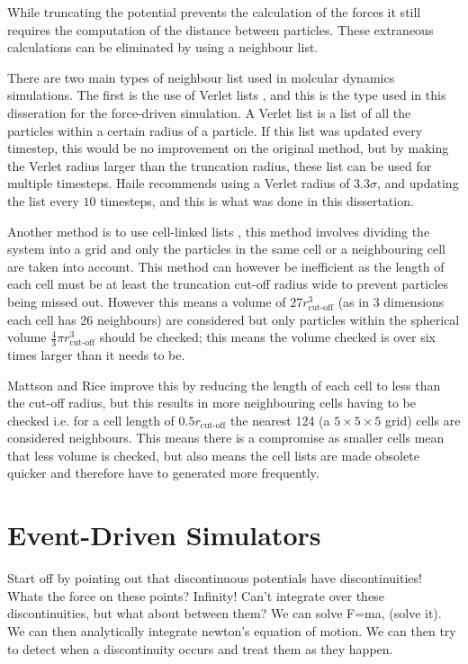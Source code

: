 \documentclass[12pt]{UoAthesis}
\begin{document}
While truncating the potential prevents the calculation of the forces
it still requires the computation of the distance between particles.
These extraneous calculations can be eliminated by using a neighbour list.

There are two main types of neighbour list used in molcular dynamics
simulations.  The first is the use of Verlet lists \cite{Verlet1967},
and this is the type used in this disseration for the force-driven
simulation.  A Verlet list is a list of all the particles within a
certain radius of a particle.  If this list was updated every
timestep, this would be no improvement on the original method, but by
making the Verlet radius larger than the truncation radius, these list
can be used for multiple timesteps.  Haile \cite{Haile1997} recommends
using a Verlet radius of $3.3\sigma$, and updating the list every $10$
timesteps, and this is what was done in this dissertation.

Another method is to use cell-linked lists \cite{Poschel2005}, this
method involves dividing the system into a grid and only the particles
in the same cell or a neighbouring cell are taken into account.  This
method can however be inefficient as the length of each cell must be
at least the truncation cut-off radius wide to prevent particles being
missed out.  However this means a volume of $27r_{\text{cut-off}}^3$
(as in 3 dimensions each cell has 26 neighbours) are considered but
only particles within the spherical volume $\frac{4}{3}\pi
r_{\text{cut-off}}^3$ should be checked; this means the volume checked
is over six times larger than it needs to be.  

Mattson and Rice \cite{Mattson1999} improve this by reducing the
length of each cell to less than the cut-off radius, but this results
in more neighbouring cells having to be checked i.e. for a cell length
of $0.5r_{\text{cut-off}}$ the nearest 124 (a $5\times 5\times 5$
grid) cells are considered neighbours. This means there is a
compromise as smaller cells mean that less volume is checked, but also
means the cell lists are made obsolete quicker and therefore have to
generated more frequently.

 \newpage
\section{Event-Driven Simulators}
 
Start off by pointing out that discontinuous potentials have
discontinuities! Whats the force on these points? Infinity! Can't
integrate over these discontinuities, but what about between them? We
can solve F=ma, (solve it). We can then analytically integrate
newton's equation of motion. We can then try to detect when a
discontinuity occurs and treat them as they happen.
\end{document}
